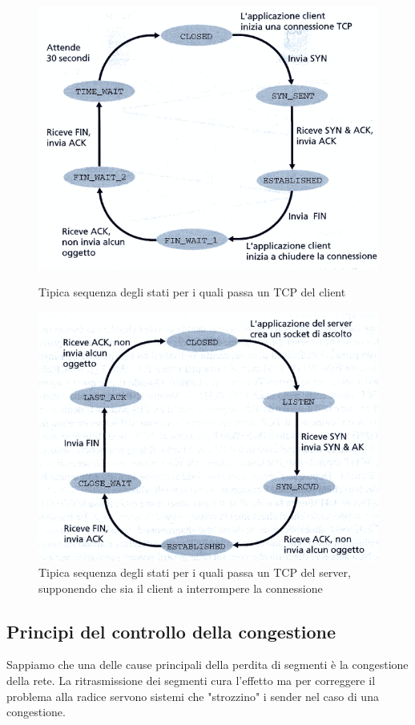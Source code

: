\documentclass[11pt,a4paper]{article}
\begin{document}
\begin{figure}
	\includegraphics[scale=0.6]{img/037.png}
	\caption{Tipica sequenza degli stati per i quali passa un TCP del client}
	\includegraphics[scale=0.6]{img/038.png}
	\caption{Tipica sequenza degli stati per i quali passa un TCP del server, supponendo che sia il client a interrompere la connessione}
\end{figure}

\subsection{Principi del controllo della congestione}
Sappiamo che una delle cause principali della perdita di segmenti è la congestione della rete. La ritrasmissione dei segmenti cura l'effetto ma per correggere il problema alla radice servono sistemi che "strozzino" i sender nel caso di una congestione.
\end{document}
